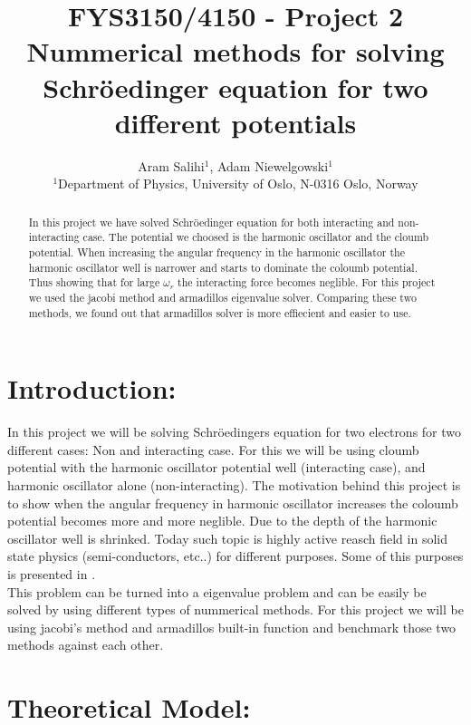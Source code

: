 \documentclass[a4paper, 10pt]{article}
\title{FYS3150/4150 - Project 2 \\
  Nummerical methods for solving Schröedinger equation for two different potentials}
\author{Aram Salihi$^1$, Adam Niewelgowski$^1$ \\
  \small $^1$Department of Physics, University of Oslo, N-0316 Oslo, Norway}
\begin{document}
\maketitle
\begin{abstract}
In this project we have solved Schröedinger equation for both interacting and non-
interacting case. The potential we choosed is the harmonic oscillator and the cloumb potential.
When increasing the angular frequency in the harmonic oscillator the harmonic oscillator well
is narrower and starts to dominate the coloumb potential. Thus showing that for large $\omega_{r}$
the interacting force becomes neglible. For this project we used the jacobi method and
armadillos eigenvalue solver. Comparing these two methods, we found out that armadillos solver is
more effiecient and easier to use.
\end{abstract}
\tableofcontents
\section{Introduction:} In this project we will be solving Schröedingers equation for two electrons for
two different cases: Non and interacting case. For this we will be using cloumb potential with the harmonic
oscillator potential well (interacting case), and harmonic oscillator alone (non-interacting). The motivation behind
this project is to show when the angular frequency in harmonic oscillator increases the coloumb potential becomes more and more neglible.
Due to the depth of the harmonic oscillator well is shrinked. Today such topic is highly active reasch field in solid state physics (semi-conductors, etc..) for different purposes.
Some of this purposes is presented in \cite{loss}.
\vspace{3mm}
\\
This problem can be turned into a eigenvalue problem and can be easily be solved by using different
types of nummerical methods. For this project we will be using jacobi's method and armadillos built-in function and benchmark
those two methods against each other.
\section{Theoretical Model:}
\end{document}
